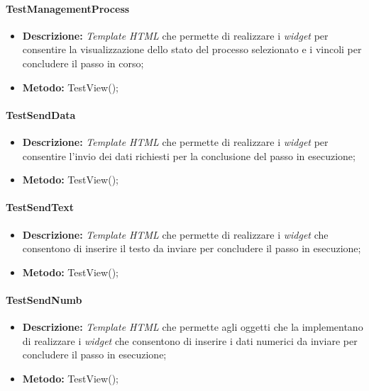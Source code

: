 \paragraph{TestManagementProcess}
\begin{itemize}
\item \textbf{Descrizione:} \textit{Template HTML} che permette di realizzare i \textit{widget} per consentire la visualizzazione dello stato del processo selezionato e i vincoli per concludere il passo in corso;
\item \textbf{Metodo:} TestView();
\end{itemize}

\paragraph{TestSendData}
\begin{itemize}
\item \textbf{Descrizione:} \textit{Template HTML} che permette di realizzare i \textit{widget} per consentire l'invio dei dati richiesti per la conclusione del passo in esecuzione;
\item \textbf{Metodo:} TestView();
\end{itemize}

\paragraph{TestSendText}
\begin{itemize}
\item \textbf{Descrizione:} \textit{Template HTML} che permette di realizzare i \textit{widget} che consentono di inserire il testo da inviare per concludere il passo in esecuzione;
\item \textbf{Metodo:} TestView();
\end{itemize}

\paragraph{TestSendNumb}
\begin{itemize}
\item \textbf{Descrizione:} \textit{Template HTML} che permette agli oggetti che la implementano di realizzare i \textit{widget} che consentono di inserire i dati numerici da inviare per concludere il passo in esecuzione;
\item \textbf{Metodo:} TestView();
\end{itemize}

